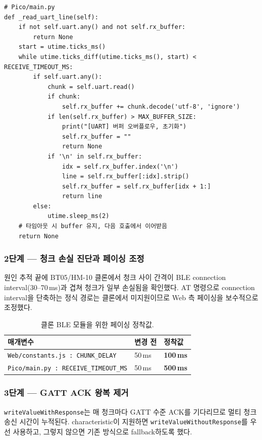 \documentclass[11pt, oneside]{article}
\begin{document}
\begin{verbatim}
# Pico/main.py
def _read_uart_line(self):
    if not self.uart.any() and not self.rx_buffer:
        return None
    start = utime.ticks_ms()
    while utime.ticks_diff(utime.ticks_ms(), start) < RECEIVE_TIMEOUT_MS:
        if self.uart.any():
            chunk = self.uart.read()
            if chunk:
                self.rx_buffer += chunk.decode('utf-8', 'ignore')
            if len(self.rx_buffer) > MAX_BUFFER_SIZE:
                print("[UART] 버퍼 오버플로우, 초기화")
                self.rx_buffer = ""
                return None
            if '\n' in self.rx_buffer:
                idx = self.rx_buffer.index('\n')
                line = self.rx_buffer[:idx].strip()
                self.rx_buffer = self.rx_buffer[idx + 1:]
                return line
        else:
            utime.sleep_ms(2)
    # 타임아웃 시 buffer 유지, 다음 호출에서 이어받음
    return None
\end{verbatim}

\subsubsection*{2단계 --- 청크 손실 진단과 페이싱 조정}

원인 추적 끝에 BT05/HM-10 클론에서 청크 사이 간격이 BLE connection
interval(30--70\,ms)과 겹쳐 청크가 일부 손실됨을 확인했다. AT 명령으로
connection interval을 단축하는 정식 경로는 클론에서 미지원이므로 Web 측
페이싱을 보수적으로 조정했다.

\begin{table}[h]
\centering
\small
\begin{tabular}{@{}lll@{}}
\toprule
매개변수 & 변경 전 & 정착값 \\
\midrule
\texttt{Web/constants.js : CHUNK\_DELAY} & 50\,ms & \textbf{100\,ms} \\
\texttt{Pico/main.py : RECEIVE\_TIMEOUT\_MS} & 50\,ms & \textbf{500\,ms} \\
\bottomrule
\end{tabular}
\caption{클론 BLE 모듈을 위한 페이싱 정착값.}
\end{table}

\subsubsection*{3단계 --- GATT ACK 왕복 제거}

\texttt{writeValueWithResponse}는 매 청크마다 GATT 수준 ACK를 기다리므로
멀티 청크 송신 시간이 누적된다. characteristic이 지원하면
\texttt{writeValueWithoutResponse}를 우선 사용하고, 그렇지 않으면 기존
방식으로 fallback하도록 했다.
\end{document}
